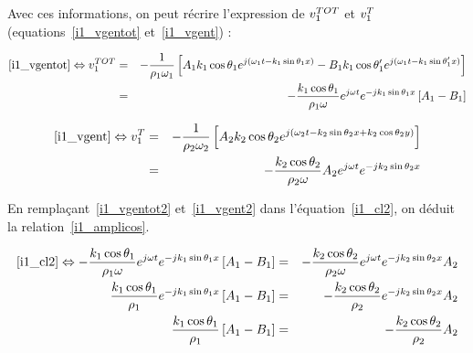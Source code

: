Avec ces informations, on peut récrire l'expression de $v^{TOT}_1$ et $v^T_1$ (equations~\eqref{i1_vgentot}
et~\eqref{i1_vgent}) :

\begin{eqnarray}
    \eqref{i1_vgentot}  \Leftrightarrow v^{TOT}_1 & = & -\frac{1}{\rho_1\omega_1}\left[A_1k_1\cos\theta_1e^{j(\omega_1t-k_1\sin\theta_1x)} -
            B_1k_1\cos\theta_1'e^{j(\omega_1t-k_1\sin\theta_1'x)}\right] \notag\\
            & = & -\frac{k_1\cos\theta_1}{\rho_1\omega}e^{j\omega t}e^{-jk_1\sin\theta_1x}\left[A_1 - B_1\right] \label{i1_vgentot2}
\end{eqnarray}

\begin{eqnarray}
    \eqref{i1_vgent} \Leftrightarrow v^T_1 & = &
    -\frac{1}{\rho_2\omega_2}\left[A_2k_2\cos\theta_2e^{j(\omega_2t-k_2\sin\theta_2x+k_2\cos\theta_2y)}\right]\notag\\
    & = & -\frac{k_2\cos\theta_2}{\rho_2\omega}A_2e^{j\omega t}e^{-jk_2\sin\theta_2x}\label{i1_vgent2}
\end{eqnarray}

En remplaçant~\eqref{i1_vgentot2} et~\eqref{i1_vgent2} dans l'équation~\eqref{i1_cl2}, on déduit la relation~\eqref{i1_amplicos}.

\begin{eqnarray}
        \eqref{i1_cl2} \Leftrightarrow -\frac{k_1\cos\theta_1}{\rho_1\omega}e^{j\omega t}e^{-jk_1\sin\theta_1x}\left[A_1 - B_1\right] & =
            & -\frac{k_2\cos\theta_2}{\rho_2\omega}e^{j\omega t}e^{-jk_2\sin\theta_2x}A_2\notag\\
        \frac{k_1\cos\theta_1}{\rho_1}e^{-jk_1\sin\theta_1x}\left[A_1 - B_1\right] & =
            & -\frac{k_2\cos\theta_2}{\rho_2}e^{-jk_2\sin\theta_2x}A_2\notag\\
        \frac{k_1\cos\theta_1}{\rho_1}\left[A_1 - B_1\right] & =
    & -\frac{k_2\cos\theta_2}{\rho_2}A_2\label{i1_amplicos}
\end{eqnarray}

